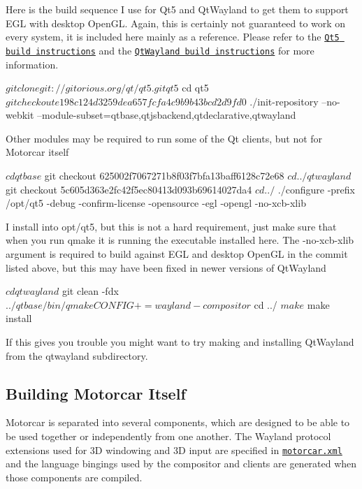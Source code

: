 Here is the build sequence I use for Qt5 and Qt\-Wayland to get them to support E\-G\-L with desktop Open\-G\-L. Again, this is certainly not guaranteed to work on every system, it is included here mainly as a reference. Please refer to the \href{http://qt-project.org/wiki/Building_Qt_5_from_Git}{\tt Qt5 build instructions} and the \href{http://qt-project.org/wiki/QtWayland}{\tt Qt\-Wayland build instructions} for more information. \begin{DoxyVerb}$ git clone git://gitorious.org/qt/qt5.git qt5
$ cd qt5
$ git checkout e198c124d3259dea657fcfa4c9b9b43bcd2d9fd0
$ ./init-repository --no-webkit  --module-subset=qtbase,qtjsbackend,qtdeclarative,qtwayland
\end{DoxyVerb}


Other modules may be required to run some of the Qt clients, but not for Motorcar itself \begin{DoxyVerb}$ cd qtbase
$ git checkout 625002f7067271b8f03f7bfa13baff6128c72e68
$ cd ../qtwayland
$ git checkout 5c605d363e2fc42f5ec80413d093b69614027da4
$ cd ../
$ ./configure -prefix /opt/qt5  -debug -confirm-license -opensource -egl -opengl  -no-xcb-xlib
\end{DoxyVerb}


I install into opt/qt5, but this is not a hard requirement, just make sure that when you run qmake it is running the executable installed here. The -\/no-\/xcb-\/xlib argument is required to build against E\-G\-L and desktop Open\-G\-L in the commit listed above, but this may have been fixed in newer versions of Qt\-Wayland \begin{DoxyVerb}$ cd qtwayland
$ git clean -fdx
$ ../qtbase/bin/qmake CONFIG+=wayland-compositor
$ cd ../
$ make
$ make install
\end{DoxyVerb}


If this gives you trouble you might want to try making and installing Qt\-Wayland from the qtwayland subdirectory.

\subsection*{Building Motorcar Itself }

Motorcar is separated into several components, which are designed to be able to be used together or independently from one another. The Wayland protocol extensions used for 3\-D windowing and 3\-D input are specified in \href{https://github.com/evil0sheep/motorcar/blob/stable/src/protocol/motorcar.xml}{\tt motorcar.\-xml} and the language bingings used by the compositor and clients are generated when those components are compiled.

